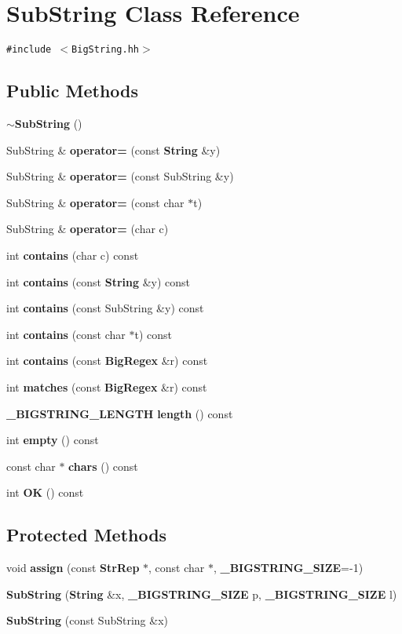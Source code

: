 \section{Sub\-String  Class Reference}
\label{classSubString}
{\tt \#include $<$Big\-String.hh$>$}

\subsection*{Public Methods}
\begin{CompactItemize}
\item 
{\bf $\sim$Sub\-String} ()
\item 
Sub\-String \& {\bf operator=} (const {\bf String} \&y)
\item 
Sub\-String \& {\bf operator=} (const Sub\-String \&y)
\item 
Sub\-String \& {\bf operator=} (const char $\ast$t)
\item 
Sub\-String \& {\bf operator=} (char c)
\item 
int {\bf contains} (char c) const
\item 
int {\bf contains} (const {\bf String} \&y) const
\item 
int {\bf contains} (const Sub\-String \&y) const
\item 
int {\bf contains} (const char $\ast$t) const
\item 
int {\bf contains} (const {\bf Big\-Regex} \&r) const
\item 
int {\bf matches} (const {\bf Big\-Regex} \&r) const
\item 
{\bf \_\-BIGSTRING\_\-LENGTH} {\bf length} () const
\item 
int {\bf empty} () const
\item 
const char $\ast$ {\bf chars} () const
\item 
int {\bf OK} () const
\end{CompactItemize}
\subsection*{Protected Methods}
\begin{CompactItemize}
\item 
void {\bf assign} (const {\bf Str\-Rep} $\ast$, const char $\ast$, {\bf \_\-BIGSTRING\_\-SIZE}=-1)
\item 
{\bf Sub\-String} ({\bf String} \&x, {\bf \_\-BIGSTRING\_\-SIZE} p, {\bf \_\-BIGSTRING\_\-SIZE} l)
\item 
{\bf Sub\-String} (const Sub\-String \&x)
\end{CompactItemize}
